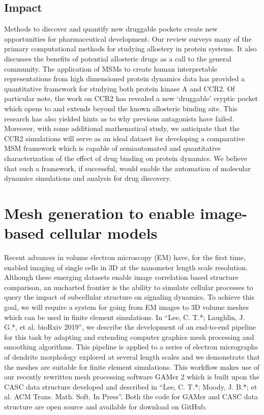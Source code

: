 \documentclass[12pt]{article}
\begin{document}
\subsection{Impact}
Methods to discover and quantify new druggable pockets create new opportunities for pharmaceutical development.
Our review surveys many of the primary computational methods for studying allostery in protein systems.
It also discusses the benefits of potential allosteric drugs as a call to the general community.
The application of MSMs to create human interpretable representations from high dimensioned protein dynamics data has provided a quantitative framework for studying both protein kinase A and CCR2.
Of particular note, the work on CCR2 has revealed a new `druggable' cryptic pocket which opens to and extends beyond the known allosteric binding site.
This research has also yielded hints as to why previous antagonists have failed.
Moreover, with some additional mathematical study, we anticipate that the CCR2 simulations will serve as an ideal dataset for developing a comparative MSM framework which is capable of semiautomated and quantitative characterization of the effect of drug binding on protein dynamics.
We believe that such a framework, if successful, would enable the automation of molecular dynamics simulations and analysis for drug discovery.

\section{Mesh generation to enable image-based cellular models}
Recent advances in volume electron microscopy (EM) have, for the first time, enabled imaging of single cells in 3D at the nanometer length scale resolution.
Although these emerging datasets enable image correlation based structure comparison, an uncharted frontier is the ability to simulate cellular processes to query the impact of subcellular structure on signaling dynamics.
To achieve this goal, we will require a system for going from EM images to 3D volume meshes which can be used in finite element simulations.
In ``Lee, C. T.*; Laughlin, J. G.*, et al. bioRxiv 2019'', we describe the development of an end-to-end pipeline for this task by adapting and extending computer graphics mesh processing and smoothing algorithms.
This pipeline is applied to a series of electron micrographs of dendrite morphology explored at several length scales and we demonstrate that the meshes are suitable for finite element simulations.
This workflow makes use of our recently rewritten mesh processing software GAMer 2 which is built upon the CASC data structure developed and described in ``Lee, C. T.*; Moody, J. B.*; et al. ACM Trans. Math. Soft. In Press''.
Both the code for GAMer and CASC data structure are open source and available for download on GitHub.
\end{document}

